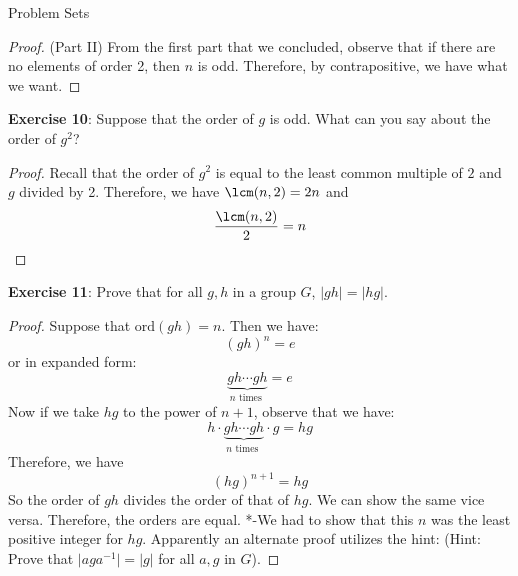 \documentclass{report}
\begin{document}
\begin{exercises}{Problem Sets}
\begin{proof}
            (Part II) From the first part that we concluded, observe that if there are no elements of order 2, then $n$ is odd. Therefore, by contrapositive, we have what we want.
        \end{proof}

    \textbf{Exercise 10}: Suppose that the order of $g$ is odd. What can you say about the order of $g^{2}$?
        \begin{proof}
            Recall that the order of $g^{2}$ is equal to the least common multiple of $2$ and $g$ divided by 2. Therefore, we have $\lcm(n, 2) = 2n$ and
                \begin{equation*}
                    \frac{\lcm(n, 2)}{2} = n
                \end{equation*}
        \end{proof}

    \textbf{Exercise 11}: Prove that for all $g, h$ in a group $G$, $\lvert gh \rvert = \lvert hg \rvert$.
        \begin{proof}
            Suppose that $\text{ord}(gh) = n$. Then we have:
                \begin{equation*}
                    (gh)^{n} = e
                \end{equation*}
            or in expanded form:
                \begin{equation*}
                    \underbrace{gh \cdots gh}_{n \text{ times }} = e
                \end{equation*}
            Now if we take $hg$ to the power of $n + 1$, observe that we have:
                \begin{equation*}
                    h \cdot \underbrace{gh \cdots gh}_{n \text{ times }} \cdot g = hg
                \end{equation*}
            Therefore, we have
                \begin{equation*}
                    (hg)^{n + 1} = hg
                \end{equation*}
            So the order of $gh$ divides the order of that of $hg$. We can show the same vice versa. Therefore, the orders are equal. *-We had to show that this $n$ was the least positive integer for $hg$. Apparently an alternate proof utilizes the hint: (Hint: Prove that $\lvert aga^{-1} \rvert = \lvert g \rvert$ for all $a, g$ in $G$).
        \end{proof}


\end{exercises}
\end{document}
